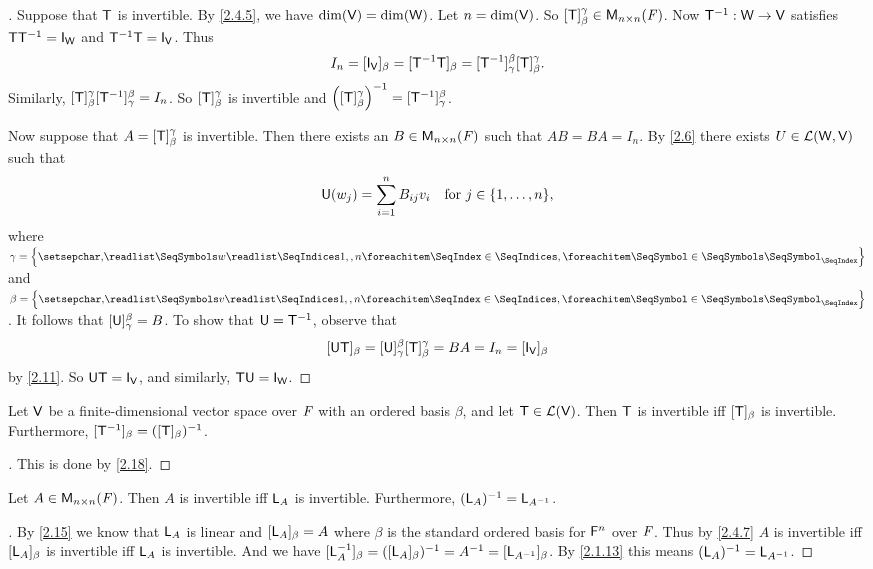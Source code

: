 \begin{proof}[]
	Suppose that \(\mathsf{T}\) is invertible.
	By \cref{2.4.5}, we have \(\dim(\mathsf{V}) = \dim(\mathsf{W})\).
	Let \(n = \dim(\mathsf{V})\).
	So \([\mathsf{T}]_{\beta}^{\gamma} \in \mathsf{M}_{{n} \times n}({\mathit{F}})\).
	Now \(\mathsf{T}^{-1} : \mathsf{W} \to \mathsf{V}\) satisfies \(\T \T^{-1} = \IT[\W]\) and \(\T^{-1} \T = \IT[\V]\).
	Thus
	\[
		I_n = [\IT[\V]]_{\beta} = [\T^{-1} \T]_{\beta} = [\T^{-1}]_{\gamma}^{\beta} [\T]_{\beta}^{\gamma}.
	\]
	Similarly, \([\mathsf{T}]_{\beta}^{\gamma} [\mathsf{T}^{-1}]_{\gamma}^{\beta} = I_n\).
	So \([\mathsf{T}]_{\beta}^{\gamma}\) is invertible and \(\left\lparen[\mathsf{T}]_{\beta}^{\gamma}\right\rparen^{-1} = [\mathsf{T}^{-1}]_{\gamma}^{\beta}\).

	Now suppose that \(A = [\mathsf{T}]_{\beta}^{\gamma}\) is invertible.
	Then there exists an \(B \in \mathsf{M}_{{n} \times n}({\mathit{F}})\) such that \(AB = BA = I_n\).
	By \cref{2.6} there exists \(U \in \mathcal{L}(\mathsf{W}, \mathsf{V})\) such that
	\[
		\U(w_j) = \sum_{i = 1}^n B_{i j} v_i \quad \text{for } j \in \set{1, \dots, n},
	\]
	where \(\gamma = \set{\seq{w}{1,,n}}\) and \(\beta = \set{\seq{v}{1,,n}}\).
	It follows that \([\mathsf{U}]_{\gamma}^{\beta} = B\).
	To show that \(\mathsf{U} = \mathsf{T}^{-1}\), observe that
	\[
		[\U \T]_{\beta} = [\U]_{\gamma}^{\beta} [\T]_{\beta}^{\gamma} = BA = I_n = [\IT[\V]]_{\beta}
	\]
	by \cref{2.11}.
	So \(\U \T = \IT[\V]\), and similarly, \(\T \U = \IT[\W]\).
\end{proof}

\begin{cor}\label{2.4.6}
	Let \(\mathsf{V}\) be a finite-dimensional vector space over \(\mathit{F}\) with an ordered basis \(\beta\), and let \(\mathsf{T} \in \mathcal{L}(\mathsf{V})\).
	Then \(\mathsf{T}\) is invertible iff \([\mathsf{T}]_{\beta}\) is invertible.
	Furthermore, \([\mathsf{T}^{-1}]_{\beta} = ([\mathsf{T}]_{\beta})^{-1}\).
\end{cor}

\begin{proof}[]
	This is done by \cref{2.18}.
\end{proof}

\begin{cor}\label{2.4.7}
	Let \(A \in \mathsf{M}_{{n} \times n}({\mathit{F}})\).
	Then \(A\) is invertible iff \(\mathsf{L}_A\) is invertible.
	Furthermore, \((\mathsf{L}_A)^{-1} = \mathsf{L}_{A^{-1}}\).
\end{cor}

\begin{proof}[]
	By \cref{2.15} we know that \(\mathsf{L}_A\) is linear and \([\mathsf{L}_A]_{\beta} = A\) where \(\beta\) is the standard ordered basis for \(\mathsf{F}^n\) over \(\mathit{F}\).
	Thus by \cref{2.4.7} \(A\) is invertible iff \([\mathsf{L}_A]_{\beta}\) is invertible iff \(\mathsf{L}_A\) is invertible.
	And we have \([\mathsf{L}_A^{-1}]_{\beta} = ([\mathsf{L}_A]_{\beta})^{-1} = A^{-1} = [\mathsf{L}_{A^{-1}}]_{\beta}\).
	By \cref{2.1.13} this means \((\mathsf{L}_A)^{-1} = \mathsf{L}_{A^{-1}}\).
\end{proof}

